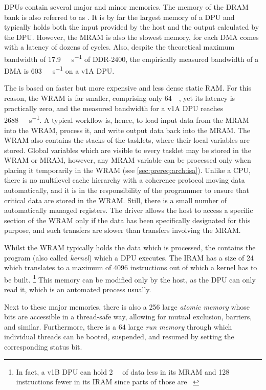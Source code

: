 \Acp{DPU} contain several major and minor memories.
The memory of the \ac{DRAM} bank is also referred to as .
It is by far the largest memory of a \ac{DPU} and typically holds both the input provided by the host and the output calculated by the \ac{DPU}.
However, the \ac{MRAM} is also the slowest memory, for each \ac{DMA} comes with a latency of dozens of cycles.
Also, despite the theoretical maximum bandwidth of \qty{17.9}{\gibi\byte\per\second} of \ac{DDR}-2400, the empirically measured bandwidth of a \ac{DMA} is \qty{603}{\mebi\byte\per\second} on a v1A \ac{DPU}.

The  is based on faster but more expensive and less dense static \ac{RAM}.
For this reason, the \ac{WRAM} is far smaller, comprising only \qty{64}{\kibi\byte}, yet its latency is practically zero, and the measured bandwidth for a v1A \ac{DPU} reaches \qty{2688}{\mebi\byte\per\second}.
A typical workflow is, hence, to load input data from the \ac{MRAM} into the \ac{WRAM}, process it, and write output data back into the \ac{MRAM}.
The \ac{WRAM} also contains the stacks of the tasklets, where their local variables are stored.
Global variables which are visible to every tasklet may be stored in the \ac{WRAM} or \ac{MRAM}, however, any \ac{MRAM} variable can be processed only when placing it temporarily in the \ac{WRAM} (see \cref{sec:prereq:arch:isa}).
Unlike a \ac{CPU}, there is no multilevel cache hierarchy with a coherence protocol moving data automatically, and it is in the responsibility of the programmer to ensure that critical data are stored in the \ac{WRAM}.
Still, there is a small number of automatically managed registers.
The driver allows the host to access a specific section of the \ac{WRAM} only if the data has been specifically designated for this purpose, and such transfers are slower than transfers involving the \ac{MRAM}.

Whilst the \ac{WRAM} typically holds the data which is processed, the  contains the program (also called \emph{kernel}) which a \ac{DPU} executes.
The \ac{IRAM} has a size of \qty{24}{\kibi\byte} which translates to a maximum of \num{4096} instructions out of which a kernel has to be built.%
\footnote{
	In fact, a v1B \ac{DPU} can hold \qty{2}{\kibi\byte} of data less in its \ac{MRAM} and 128 instructions fewer in its \ac{IRAM} since parts of those are ~\cite[Introduction~-- DPU chip characteristics]{upmemSDK}
}
This memory can be modified only by the host, as the \ac{DPU} can only read it, which is an automated process usually.

Next to these major memories, there is also a \qty{256}{\bits} large \emph{atomic memory} whose bits are accessible in a thread-safe way, allowing for mutual exclusion, barriers, and similar.
Furthermore, there is a \qty{64}{\bits} large \emph{run memory} through which individual threads can be booted, suspended, and resumed by setting the corresponding status bit.
